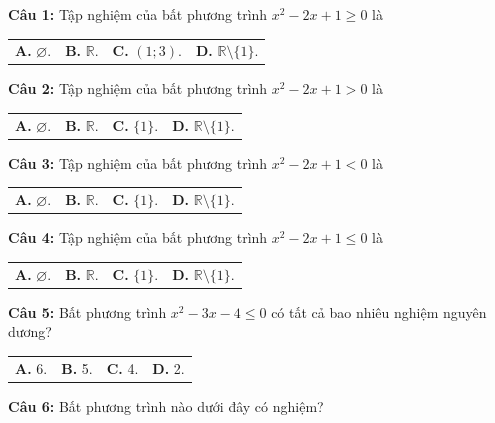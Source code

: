 \documentclass[12pt,a4paper]{extarticle}
\begin{document}
\makeheadbox[headerright={Tổng ôn 10-11},chude={CHỦ ĐỀ 04},tieude={Tam thức bậc hai},dinhdang={Đại số},lop={12 },gv={Nguyễn Lê Minh Ngọc}]

\vspace{2em}
\noindent\textbf{Câu 1:} Tập nghiệm của bất phương trình $x^2-2x+1\ge 0$ là
\begin{center}
\begin{tabular}{p{3.5cm} p{3.5cm} p{3.5cm} p{3.5cm}}
\textbf{A.} $\varnothing$. & \textbf{B.} $\mathbb{R}$. & \textbf{C.} $(1;3)$. & \textbf{D.} $\mathbb{R} \setminus \{1\}$.
\end{tabular}
\end{center}
\noindent\textbf{Câu 2:} Tập nghiệm của bất phương trình $x^2-2x+1>0$ là
\begin{center}
\begin{tabular}{p{3.5cm} p{3.5cm} p{3.5cm} p{3.5cm}}
\textbf{A.} $\varnothing$. & \textbf{B.} $\mathbb{R}$. & \textbf{C.} $\{1\}$. & \textbf{D.} $\mathbb{R} \setminus \{1\}$.
\end{tabular}
\end{center}
\noindent\textbf{Câu 3:} Tập nghiệm của bất phương trình $x^2-2x+1<0$ là
\begin{center}
\begin{tabular}{p{3.5cm} p{3.5cm} p{3.5cm} p{3.5cm}}
\textbf{A.} $\varnothing$. & \textbf{B.} $\mathbb{R}$. & \textbf{C.} $\{1\}$. & \textbf{D.} $\mathbb{R} \setminus \{1\}$.
\end{tabular}
\end{center}
\noindent\textbf{Câu 4:} Tập nghiệm của bất phương trình $x^2-2x+1\le 0$ là
\begin{center}
\begin{tabular}{p{3.5cm} p{3.5cm} p{3.5cm} p{3.5cm}}
\textbf{A.} $\varnothing$. & \textbf{B.} $\mathbb{R}$. & \textbf{C.} $\{1\}$. & \textbf{D.} $\mathbb{R} \setminus \{1\}$.
\end{tabular}
\end{center}
\noindent\textbf{Câu 5:} Bất phương trình $x^2-3x-4\le 0$ có tất cả bao nhiêu nghiệm nguyên dương?
\begin{center}
\begin{tabular}{p{3.5cm} p{3.5cm} p{3.5cm} p{3.5cm}}
\textbf{A.} 6. & \textbf{B.} 5. & \textbf{C.} 4. & \textbf{D.} 2.
\end{tabular}
\end{center}
\noindent\textbf{Câu 6:} Bất phương trình nào dưới đây có nghiệm?
\end{document}
